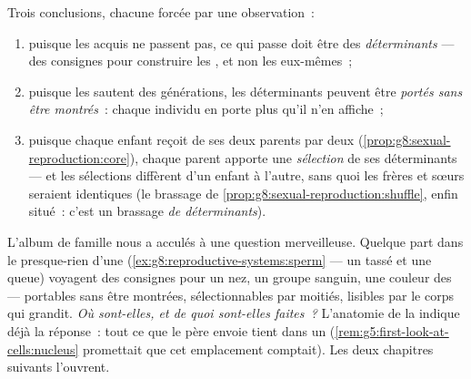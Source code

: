 \begin{proposition}\label{prop:g9:heredity-and-traits:conclusions}
Trois conclusions, chacune forcée par une observation~:
\begin{enumerate}
  \item puisque les  acquis ne passent pas, ce
        qui passe doit être des \emph{déterminants} --- des
        consignes pour construire les , et non
        les  eux-mêmes~;
  \item puisque les  sautent des générations, les
        déterminants peuvent être \emph{portés sans être
        montrés}~: chaque individu en porte plus qu'il
        n'en affiche~;
  \item puisque chaque enfant reçoit de ses deux parents
        par deux 
        (\cref{prop:g8:sexual-reproduction:core}), chaque
        parent apporte une \emph{sélection} de ses
        déterminants --- et les sélections diffèrent d'un
        enfant à l'autre, sans quoi les frères et sœurs
        seraient identiques (le brassage de
        \cref{prop:g8:sexual-reproduction:shuffle}, enfin
        situé~: c'est un brassage \emph{de déterminants}).
\end{enumerate}
\end{proposition}
\admitted

\begin{remark}\label{rem:g9:heredity-and-traits:question}
L'album de famille nous a acculés à une question
merveilleuse. Quelque part dans le presque-rien d'une
 (\cref{ex:g8:reproductive-systems:sperm} --- un
 tassé et une queue) voyagent des consignes pour un
nez, un groupe sanguin, une couleur des  --- portables
sans être montrées, sélectionnables par moitiés, lisibles
par le corps qui grandit. \emph{Où sont-elles, et de quoi
sont-elles faites~?} L'anatomie de la  indique
déjà la réponse~: tout ce que le père envoie tient dans un
 (\cref{rem:g5:first-look-at-cells:nucleus} promettait
que cet emplacement comptait). Les deux chapitres suivants
l'ouvrent.
\end{remark}

